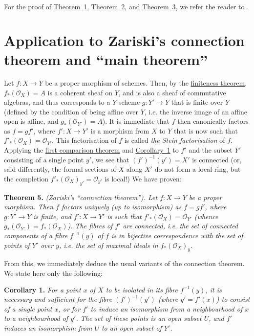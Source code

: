 \documentclass{article}
\newenvironment{itenv}[1]
  {\phantomsection\par\medskip\noindent\textbf{#1.}\itshape}
  {\par\medskip}
\newcommand{\scr}[1]{{\mathscr{#1}}}
\newcommand{\oldpage}[1]{\marginpar{\footnotesize$\Big\vert$ \textit{p.~#1}}}
\begin{document}
For the proof of \hyperref[theorem1]{Theorem~1}, \hyperref[theorem2]{Theorem~2}, and \hyperref[theorem3]{Theorem~3}, we refer the reader to \cite{1}.


\section{Application to Zariski's connection theorem and ``main theorem''}
\label{section4}

Let $f\colon X\to Y$ be a proper morphism of schemes.
Then, by the \hyperref[theorem1]{finiteness theorem}, $f_*(\scr{O}_X)=\underline{A}$ is a coherent sheaf on $Y$, and is also a sheaf of commutative algebras, and thus corresponds to a $Y$-scheme $g\colon Y'\to Y$ that is finite over $Y$ (defined by the condition of being affine over $Y$, i.e. the inverse image of an affine open is affine, and $g_*(\scr{O}_{Y'})=\underline{A}$).
It is immediate that $f$ then canonically factors as $f=gf'$, where $f'\colon X\to Y'$ is a morphism from $X$ to $Y$ that is now such that $f'_*(\scr{O}_X)=\scr{O}_{Y'}$.
This factorisation of $f$ is called \emph{the Stein factorisation} of $f$.
Applying the \hyperref[theorem2]{first comparison theorem} and \hyperref[theorem2corollary1]{Corollary~1} to $f'$ and the subset $Y'$ consisting of a single point $y'$, we see that $(f')^{-1}(y')=X'$ is connected (or, said differently, the formal sections of $X$ along $X'$ do not form a local ring, but the completion $f'_*(\scr{O}_X)_{y'}=\scr{O}_{y'}$ is local!)
We have proven:

\begin{itenv}{Theorem 5}
\label{theorem5}
  \emph{(Zariski's ``connection theorem'').}
  Let $f\colon X\to Y$ be a proper morphism.
  Then $f$ factors uniquely (up to isomorphism) as $f=gf'$, where $g\colon Y'\to Y$ is finite, and $f'\colon X\to Y'$ is such that $f'_*(\scr{O}_X)=\scr{O}_{Y'}$ (whence $g_*(\scr{O}_{Y'})=f_*(\scr{O}_X)$).
  The fibres of $f'$ are connected,
\oldpage{182-06}
  i.e. the set of connected components of a fibre $f^{-1}(y)$ of $f$ is in bijective correspondence with the set of points of $Y'$ over $y$, i.e. the set of maximal ideals in $f_*(\scr{O}_X)_y$.
\end{itenv}

From this, we immediately deduce the usual variants of the connection theorem.
We state here only the following:

\begin{itenv}{Corollary 1}
\label{theorem5corollary1}
  For a point $x$ of $X$ to be isolated in its fibre $f^{-1}(y)$, it is necessary and sufficient for the fibre $(f')^{-1}(y')$ (where $y'=f'(x)$) to consist of a single point $x$, or for $f'$ to induce an isomorphism from a neighbourhood of $x$ to a neighbourhood of $y'$.
  The set of these points is an open subset $U$, and $f'$ induces an isomorphism from $U$ to an open subset of $Y'$.
\end{itenv}
\end{document}
